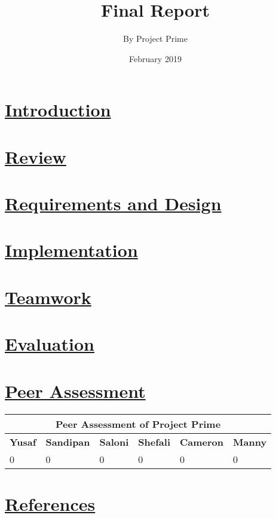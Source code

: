 \documentclass{article}
\title{Final Report}
\author{By Project Prime}
\date{February 2019}
\begin{document}
   \maketitle
 	\section{\underline{Introduction}}

	\section{\underline{Review}}

	\section{\underline{Requirements and Design}}

	\section{\underline{Implementation}}
	
	\section{\underline{Teamwork}}

	\section{\underline{Evaluation}}

	\section{\underline{Peer Assessment}}
	\begin{tabular}{|p{2cm}|p{2cm}|p{2cm}|p{2cm}|p{2cm}|p{2cm}|}
	\hline
	\multicolumn{6}{|c|}{\textbf{Peer Assessment of Project Prime}} \\
	\hline
	\textbf{Yusaf} & \textbf{Sandipan} & \textbf{Saloni} & \textbf{Shefali} & \textbf{Cameron} & \textbf{Manny} \\
	\hline
	0 & 0 & 0 & 0 & 0 & 0 \\
	\hline
	\end{tabular}
	\section{\underline{References}}
\end{document}
